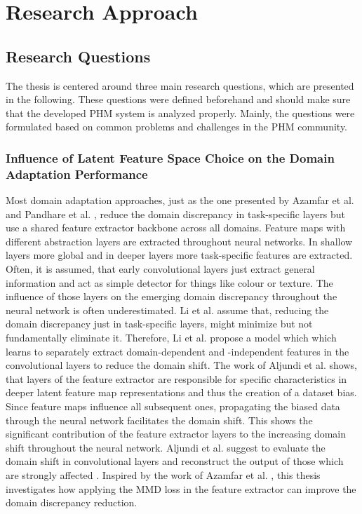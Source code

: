 \chapter{Research Approach}\label{chapter:research_approach}

\section{Research Questions}
The thesis is centered around three main research questions, which are presented in the following. These questions were defined beforehand and should make sure that the developed PHM system is analyzed properly. Mainly, the questions were formulated based on common problems and challenges in the PHM community. 

\subsection{Influence of Latent Feature Space Choice on the Domain Adaptation Performance}
Most domain adaptation approaches, just as the one presented by Azamfar et al. \cite{AZAMFAR2020103932} and Pandhare et al. \cite{Pandhare2021}, reduce the domain discrepancy in task-specific layers but use a shared feature extractor backbone across all domains. Feature maps with different abstraction layers are extracted throughout neural networks. In shallow layers more global and in deeper layers more task-specific features are extracted. Often, it is assumed, that early convolutional layers just extract general information and act as simple detector for things like colour or texture. The influence of those layers on the emerging domain discrepancy throughout the neural network is often underestimated. Li et al. \cite{li2020} assume that, reducing the domain discrepancy just in task-specific layers, might minimize but not fundamentally eliminate it. Therefore, Li et al. \cite{li2020} propose a model which which learns to separately extract domain-dependent and -independent features in the convolutional layers to reduce the domain shift. The work of Aljundi et al. \cite{Aljundi2016} shows, that layers of the feature extractor are responsible for specific characteristics in deeper latent feature map representations and thus the creation of a dataset bias. Since feature maps influence all subsequent ones, propagating the biased data through the neural network facilitates the domain shift. This shows the significant contribution of the feature extractor layers to the increasing domain shift throughout the neural network. Aljundi et al. suggest to evaluate the domain shift in convolutional layers and reconstruct the output of those which are strongly affected \cite{Aljundi2016}. Inspired by the work of Azamfar et al. \cite{Aljundi2016}, this thesis investigates how applying the MMD loss in the feature extractor can improve the domain discrepancy reduction.


